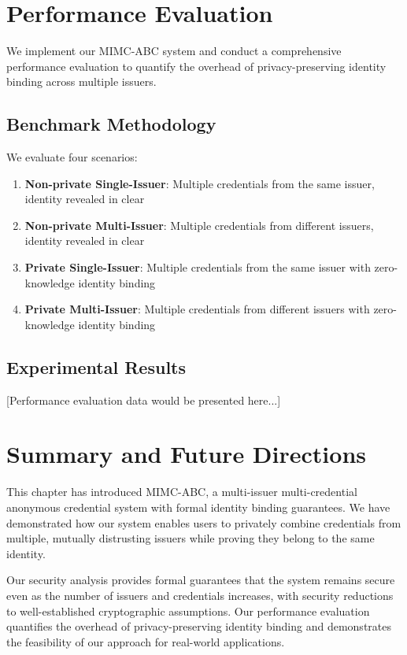 \section{Performance Evaluation}
We implement our MIMC-ABC system and conduct a comprehensive performance evaluation to quantify the overhead of privacy-preserving identity binding across multiple issuers.

\subsection{Benchmark Methodology}
We evaluate four scenarios:
\begin{enumerate}
    \item \textbf{Non-private Single-Issuer}: Multiple credentials from the same issuer, identity revealed in clear
    \item \textbf{Non-private Multi-Issuer}: Multiple credentials from different issuers, identity revealed in clear
    \item \textbf{Private Single-Issuer}: Multiple credentials from the same issuer with zero-knowledge identity binding
    \item \textbf{Private Multi-Issuer}: Multiple credentials from different issuers with zero-knowledge identity binding
\end{enumerate}

\subsection{Experimental Results}
[Performance evaluation data would be presented here...]

\section{Summary and Future Directions}
This chapter has introduced MIMC-ABC, a multi-issuer multi-credential anonymous credential system with formal identity binding guarantees. We have demonstrated how our system enables users to privately combine credentials from multiple, mutually distrusting issuers while proving they belong to the same identity.

Our security analysis provides formal guarantees that the system remains secure even as the number of issuers and credentials increases, with security reductions to well-established cryptographic assumptions. Our performance evaluation quantifies the overhead of privacy-preserving identity binding and demonstrates the feasibility of our approach for real-world applications.

